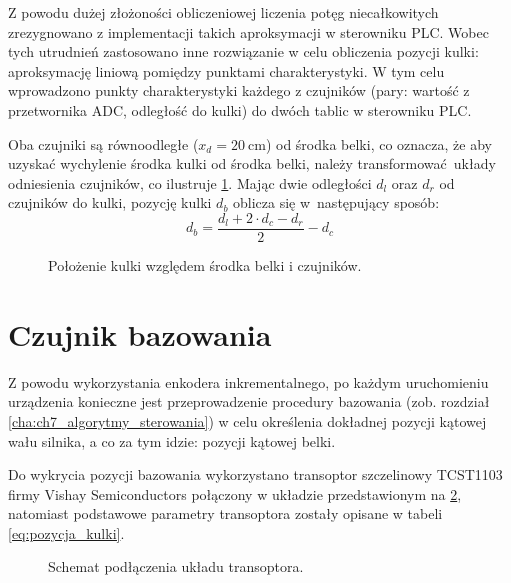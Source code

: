 Z powodu dużej złożoności obliczeniowej liczenia potęg niecałkowitych zrezygnowano z implementacji takich aproksymacji w sterowniku PLC. Wobec tych utrudnień zastosowano inne rozwiązanie w celu obliczenia pozycji kulki: aproksymację liniową pomiędzy punktami charakterystyki. W tym celu wprowadzono punkty charakterystyki każdego z czujników (pary: wartość z przetwornika ADC, odległość do kulki) do dwóch tablic w sterowniku PLC.

Oba czujniki są równoodległe ($x_d = \SI{20}{\centi\meter}$) od środka belki, co oznacza, że aby uzyskać wychylenie środka kulki od środka belki, należy transformować układy odniesienia czujników, co ilustruje \cref{fig:polozenie_kulki}. Mając dwie odległości $d_l$ oraz $d_r$ od czujników do kulki, pozycję kulki $d_b$ oblicza się w~następujący sposób:
\begin{equation}\label{eq:pozycja_kulki}
d_b = \frac{d_l + 2\cdot d_c - d_r}{2} - d_c
\end{equation}

\begin{figure}[H]
    \centering
    
    \caption{Położenie kulki względem środka belki i czujników.}
    \label{fig:polozenie_kulki}
\end{figure}


\section{Czujnik bazowania}
\label{sec:ch3_czujnik_bazowania}

Z powodu wykorzystania enkodera inkrementalnego, po każdym uruchomieniu urządzenia konieczne jest przeprowadzenie procedury bazowania (zob. rozdział \ref{cha:ch7_algorytmy_sterowania}) w celu określenia dokładnej pozycji kątowej wału silnika, a co za tym idzie: pozycji kątowej belki.

Do wykrycia pozycji bazowania wykorzystano transoptor szczelinowy TCST1103 firmy Vishay Semiconductors połączony w układzie przedstawionym na \cref{fig:uklad_transoptora}, natomiast podstawowe parametry transoptora zostały opisane w tabeli \ref{eq:pozycja_kulki}.

\begin{figure}[H]
    \centering
    
    \caption{Schemat podłączenia układu transoptora.}
    \label{fig:uklad_transoptora}
\end{figure}

